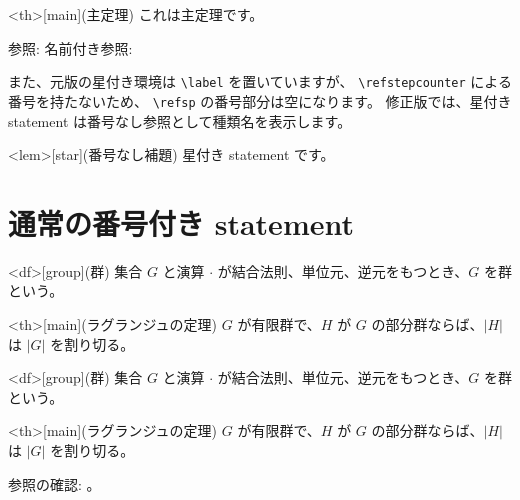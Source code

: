 \documentclass{ltjsarticle}
\begin{document}
\begin{codeblock}

\begin{statementsp}<th>[main](主定理)
これは主定理です。
\end{statementsp}

参照: 
名前付き参照: 
\end{codeblock}

また、元版の星付き環境は \texttt{\textbackslash label} を置いていますが、
\texttt{\textbackslash refstepcounter} による番号を持たないため、
\texttt{\textbackslash refsp} の番号部分は空になります。
修正版では、星付き statement は番号なし参照として種類名を表示します。

\begin{codeblock}
\begin{statementsp*}<lem>[star](番号なし補題)
星付き statement です。
\end{statementsp*}

\end{codeblock}

\section{通常の番号付き statement}

\begin{codeblock}
\begin{statementsp}<df>[group](群)
集合 $G$ と演算 $\cdot$ が結合法則、単位元、逆元をもつとき、$G$ を群という。
\end{statementsp}

\begin{statementsp}<th>[main](ラグランジュの定理)
$G$ が有限群で、$H$ が $G$ の部分群ならば、$|H|$ は $|G|$ を割り切る。
\end{statementsp}
\end{codeblock}

\begin{statementsp}<df>[group](群)
集合 $G$ と演算 $\cdot$ が結合法則、単位元、逆元をもつとき、$G$ を群という。
\end{statementsp}

\begin{statementsp}<th>[main](ラグランジュの定理)
$G$ が有限群で、$H$ が $G$ の部分群ならば、$|H|$ は $|G|$ を割り切る。
\end{statementsp}

参照の確認: 。
\end{document}
